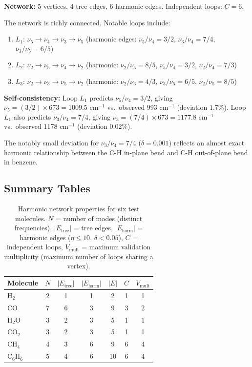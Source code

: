 \documentclass[11pt,a4paper]{article}
\theoremstyle{definition}
\theoremstyle{remark}
\begin{document}
\textbf{Network:} 5 vertices, 4 tree edges, 6 harmonic edges. Independent loops: $C = 6$.

The network is richly connected. Notable loops include:
\begin{enumerate}[nosep]
\item $L_1$: $\nu_5 \to \nu_4 \to \nu_3 \to \nu_5$ (harmonic edges: $\nu_5/\nu_4 = 3/2$, $\nu_3/\nu_4 = 7/4$, $\nu_3/\nu_5 = 6/5$)
\item $L_2$: $\nu_2 \to \nu_5 \to \nu_4 \to \nu_2$ (harmonic: $\nu_2/\nu_5 = 8/5$, $\nu_5/\nu_4 = 3/2$, $\nu_2/\nu_4 = 7/3$)
\item $L_3$: $\nu_2 \to \nu_3 \to \nu_5 \to \nu_2$ (harmonic: $\nu_2/\nu_3 = 4/3$, $\nu_3/\nu_5 = 6/5$, $\nu_2/\nu_5 = 8/5$)
\end{enumerate}

\textbf{Self-consistency:} Loop $L_1$ predicts $\nu_5/\nu_4 = 3/2$, giving $\nu_5 = (3/2) \times 673 = 1009.5$ cm$^{-1}$ vs.\ observed $993$ cm$^{-1}$ (deviation $1.7\%$). Loop $L_1$ also predicts $\nu_3/\nu_4 = 7/4$, giving $\nu_3 = (7/4) \times 673 = 1177.8$ cm$^{-1}$ vs.\ observed $1178$ cm$^{-1}$ (deviation $0.02\%$).

The notably small deviation for $\nu_3/\nu_4 = 7/4$ ($\delta = 0.001$) reflects an almost exact harmonic relationship between the C-H in-plane bend and C-H out-of-plane bend in benzene.

\subsection{Summary Tables}
\label{subsec:tables}

\begin{table}[H]
\centering
\caption{Harmonic network properties for six test molecules. $N$ = number of modes (distinct frequencies), $|E_{\mathrm{tree}}|$ = tree edges, $|E_{\mathrm{harm}}|$ = harmonic edges ($\eta \leq 10$, $\delta < 0.05$), $C$ = independent loops, $V_{\mathrm{mult}}$ = maximum validation multiplicity (maximum number of loops sharing a vertex).}
\label{tab:network_properties}
\begin{tabular}{@{}lcccccc@{}}
\toprule
Molecule & $N$ & $|E_{\mathrm{tree}}|$ & $|E_{\mathrm{harm}}|$ & $|E|$ & $C$ & $V_{\mathrm{mult}}$ \\
\midrule
H$_2$     & 2 & 1 & 1 & 2 & 1 & 1 \\
CO        & 7 & 6 & 3 & 9 & 3 & 2 \\
H$_2$O    & 3 & 2 & 3 & 5 & 1 & 1 \\
CO$_2$    & 3 & 2 & 3 & 5 & 1 & 1 \\
CH$_4$    & 4 & 3 & 6 & 9 & 6 & 4 \\
C$_6$H$_6$ & 5 & 4 & 6 & 10 & 6 & 4 \\
\bottomrule
\end{tabular}
\end{table}
\end{document}
